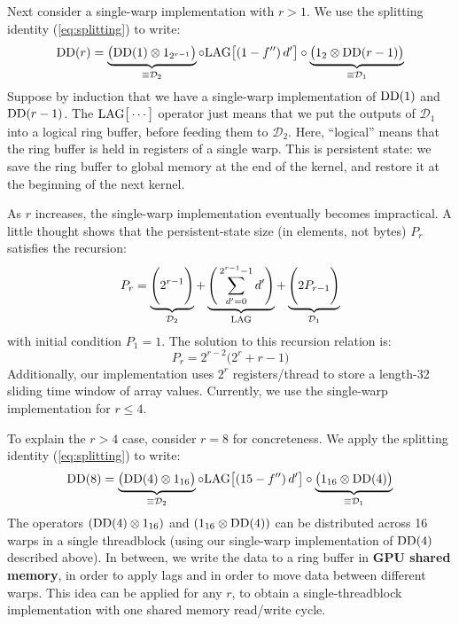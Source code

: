 \documentclass{article}
\numberwithin{equation}{section}   %
\def\DD{{\rm DD}}
\def\LAG{{\rm LAG}}
\begin{document}
Next consider a single-warp implementation with $r>1$.
We use the splitting identity (\ref{eq:splitting}) to write:
\begin{equation}
\DD(r) = \underbrace{\big( \DD(1) \otimes 1_{2^{r-1}} \big)}_{\equiv {\mathcal D}_2} 
  \circ \LAG\big[ (1-f'')\, d' \big] 
  \circ \underbrace{\big( 1_2 \otimes \DD(r-1) \big)}_{\equiv {\mathcal D}_1}
\end{equation}
Suppose by induction that we have a single-warp implementation of $\DD(1)$ and $\DD(r-1)$.
The $\LAG\big[\cdots\big]$ operator just means that we put the outputs of ${\mathcal D}_1$
into a logical ring buffer, before feeding them to ${\mathcal D}_2$.
Here, ``logical'' means that the ring buffer is held in registers of a single warp.
This is persistent state: we save the ring buffer to global memory at the end of the kernel, 
and restore it at the beginning of the next kernel.

As $r$ increases, the single-warp implementation eventually becomes impractical.
A little thought shows that the persistent-state size (in elements, not bytes) $P_r$ 
satisfies the recursion:
\begin{equation}
P_r = \underbrace{\Bigg( 2^{r-1} \Bigg)}_{{\mathcal D}_2} 
  + \underbrace{\Bigg( \sum_{d'=0}^{2^{r-1}-1} d' \Bigg)}_{\rm LAG}
  + \underbrace{\Bigg( 2 P_{r-1} \Bigg)}_{{\mathcal D}_1}
\end{equation}
with initial condition $P_1=1$. The solution to this recursion relation is:
\begin{equation}
P_r = 2^{r-2} \big( 2^r + r - 1 \big)  \label{eq:Pr_def}
\end{equation}
Additionally, our implementation uses $2^r$ registers/thread to store a length-32
sliding time window of array values.
Currently, we use the single-warp implementation for $r \le 4$.

To explain the $r > 4$ case, consider $r=8$ for concreteness.
We apply the splitting identity (\ref{eq:splitting}) to write:
\begin{equation}
\DD(8) = \underbrace{\big( \DD(4) \otimes 1_{16} \big)}_{\equiv {\mathcal D}_2}
   \circ \LAG\big[ (15-f'') \, d' \big] 
   \circ \underbrace{\big(1_{16} \otimes \DD(4) \big)}_{\equiv {\mathcal D}_1}
\label{eq:DD8}
\end{equation}
The operators $(\DD(4) \otimes 1_{16})$ and $(1_{16} \otimes \DD(4))$ can be distributed
across 16 warps in a single threadblock (using our single-warp implementation of $\DD(4)$
described above).
In between, we write the data to a ring buffer in {\bf GPU shared memory}, in order to apply 
lags and in order to move data between different warps.
This idea can be applied for any $r$, to obtain a single-threadblock implementation
with one shared memory read/write cycle.
\end{document}

